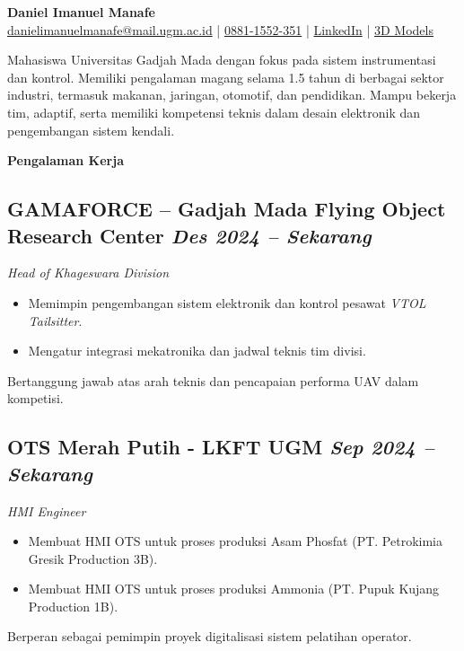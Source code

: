 \documentclass[a4paper,11pt]{article}
\begin{document}
	
	\begin{center}
		{\Huge \textbf{Daniel Imanuel Manafe}}\\[0.5em]
		{\small
			\href{mailto:danielimanuelmanafe@mail.ugm.ac.id}{danielimanuelmanafe@mail.ugm.ac.id} \quad | \quad
			\href{https://wa.me/628811552351}{0881-1552-351} \quad | \quad
			\href{https://bit.ly/Niell_LinkedIn}{LinkedIn} \quad | \quad
			\href{https://bit.ly/Niell_3DModels}{3D Models}
		}
	\end{center}	
	\vspace{1em}
	Mahasiswa Universitas Gadjah Mada dengan fokus pada sistem instrumentasi dan kontrol. Memiliki pengalaman magang selama 1.5 tahun di berbagai sektor industri, termasuk makanan, jaringan, otomotif, dan pendidikan. Mampu bekerja tim, adaptif, serta memiliki kompetensi teknis dalam desain elektronik dan pengembangan sistem kendali.
	
	\vspace{1em}
	\begin{center}
		{\large\bfseries Pengalaman Kerja}\\[-0.6em]
		\noindent\makebox[\linewidth]{\rule{\textwidth}{0.4pt}}
	\end{center}

	\subsection*{GAMAFORCE – Gadjah Mada Flying Object Research Center \hfill \textnormal{\textit{Des 2024 – Sekarang}}}
	\textit{Head of Khageswara Division}
	\begin{itemize}
		\item Memimpin pengembangan sistem elektronik dan kontrol pesawat \textit{VTOL Tailsitter}.
		\item Mengatur integrasi mekatronika dan jadwal teknis tim divisi.
	\end{itemize}
	\noindent Bertanggung jawab atas arah teknis dan pencapaian performa UAV dalam kompetisi.\\

	\subsection*{OTS Merah Putih - LKFT UGM \hfill \textnormal{\textit{Sep 2024 – Sekarang}}}
	\textit{HMI Engineer}
	\begin{itemize}
		\item Membuat HMI OTS untuk proses produksi Asam Phosfat (PT. Petrokimia Gresik Production 3B).
		\item Membuat HMI OTS untuk proses produksi Ammonia (PT. Pupuk Kujang Production 1B).
	\end{itemize}
	\noindent Berperan sebagai pemimpin proyek digitalisasi sistem pelatihan operator.\\
	
\end{document}
